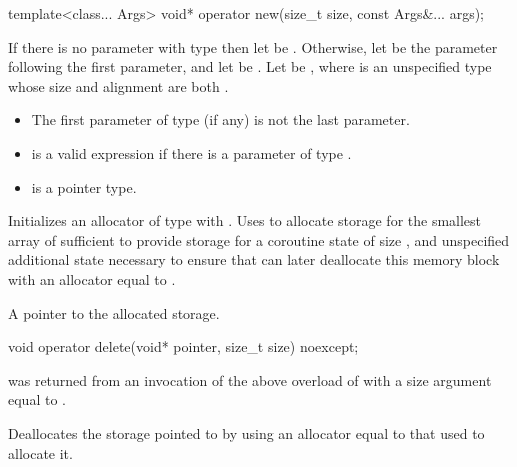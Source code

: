 %
\begin{itemdecl}
template<class... Args>
  void* operator new(size_t size, const Args&... args);
\end{itemdecl}
\begin{itemdescr}
\pnum
If there is no parameter with type  then let
 be .
Otherwise, let  be the parameter
following the first  parameter,
and let  be .
Let  be , where  is an unspecified type
whose size and alignment are both .

\pnum
\mandates
\begin{itemize}
\item The first parameter of type  (if any) is not the last parameter.
\item {} is a valid expression if there is a parameter
of type .
\item {} is a pointer type.
\end{itemize}

\pnum
\effects
Initializes an allocator  of type  with
.
Uses  to allocate storage for the
smallest array of  sufficient to provide storage for a
coroutine state of size , and unspecified additional
state necessary to ensure that  can later
deallocate this memory block with an allocator equal to .

\pnum
\returns
A pointer to the allocated storage.
\end{itemdescr}

%
\begin{itemdecl}
void operator delete(void* pointer, size_t size) noexcept;
\end{itemdecl}
\begin{itemdescr}
\pnum
\expects
{} was returned from an invocation of the above overload
of  with a size argument equal to .

\pnum
\effects
Deallocates the storage pointed to by  using an
allocator equal to that used to allocate it.
\end{itemdescr}

